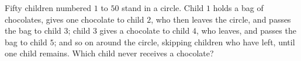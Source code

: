 Fifty children numbered $1$ to $50$ stand in a circle. Child $1$ holds a bag of chocolates, gives one chocolate to child $2$, who then leaves the circle, and passes the bag to child $3$; child $3$ gives a chocolate to child $4$, who leaves, and passes the bag to child $5$; and so on around the circle, skipping children who have left, until one child remains. Which child never receives a chocolate?
